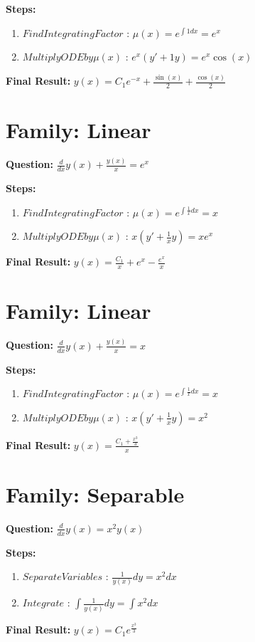 \documentclass{article}
\begin{document}
\textbf{Steps:}
\begin{enumerate}
\item $Find Integrating Factor$ :  $\mu(x) = e^{\int 1 dx} = e^{x}$
\item $Multiply ODE by \mu(x)$ :  $e^{x}(y' + 1y) = e^{x} \cos{\left(x \right)}$
\end{enumerate}
\textbf{Final Result:} $y{\left(x \right)} = C_{1} e^{- x} + \frac{\sin{\left(x \right)}}{2} + \frac{\cos{\left(x \right)}}{2}$

\section*{Family: Linear}
\textbf{Question:} $\frac{d}{d x} y{\left(x \right)} + \frac{y{\left(x \right)}}{x} = e^{x}$

\textbf{Steps:}
\begin{enumerate}
\item $Find Integrating Factor$ :  $\mu(x) = e^{\int \frac{1}{x} dx} = x$
\item $Multiply ODE by \mu(x)$ :  $x(y' + \frac{1}{x}y) = x e^{x}$
\end{enumerate}
\textbf{Final Result:} $y{\left(x \right)} = \frac{C_{1}}{x} + e^{x} - \frac{e^{x}}{x}$

\section*{Family: Linear}
\textbf{Question:} $\frac{d}{d x} y{\left(x \right)} + \frac{y{\left(x \right)}}{x} = x$

\textbf{Steps:}
\begin{enumerate}
\item $Find Integrating Factor$ :  $\mu(x) = e^{\int \frac{1}{x} dx} = x$
\item $Multiply ODE by \mu(x)$ :  $x(y' + \frac{1}{x}y) = x^{2}$
\end{enumerate}
\textbf{Final Result:} $y{\left(x \right)} = \frac{C_{1} + \frac{x^{3}}{3}}{x}$

\section*{Family: Separable}
\textbf{Question:} $\frac{d}{d x} y{\left(x \right)} = x^{2} y{\left(x \right)}$

\textbf{Steps:}
\begin{enumerate}
\item $Separate Variables$ :  $\frac{1}{y{\left(x \right)}} dy = x^{2} dx$
\item $Integrate$ :  $\int \frac{1}{y{\left(x \right)}} dy = \int x^{2} dx$
\end{enumerate}
\textbf{Final Result:} $y{\left(x \right)} = C_{1} e^{\frac{x^{3}}{3}}$
\end{document}
